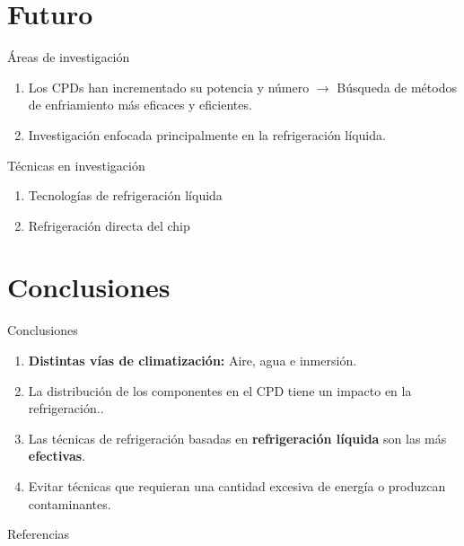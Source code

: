\documentclass[aspectratio=169, compress]{beamer}
\begin{document}
\section{Futuro}

\begin{frame}{Áreas de investigación}
    \begin{enumerate}
        \item Los CPDs han incrementado su potencia y número $\rightarrow$ Búsqueda de métodos de enfriamiento más eficaces y eficientes.
        \item Investigación enfocada principalmente en la refrigeración líquida.
    \end{enumerate}
\end{frame}

\begin{frame}{Técnicas en investigación}
    \begin{enumerate}
        \item Tecnologías de refrigeración líquida
        \item Refrigeración directa del chip
    \end{enumerate}
\end{frame}




\section{Conclusiones}

\begin{frame}{Conclusiones}
    \begin{enumerate}
        \item \textbf{Distintas vías de climatización:} Aire, agua e inmersión.
        \item La distribución de los componentes en el CPD tiene un impacto en la refrigeración.. 
        \item Las técnicas de refrigeración basadas en \textbf{refrigeración líquida} son las más \textbf{efectivas}.
        \item Evitar técnicas que requieran una cantidad excesiva de energía o produzcan contaminantes.
    \end{enumerate}
\end{frame}

\begin{frame}{Referencias}
    
    
\end{frame}
\end{document}
